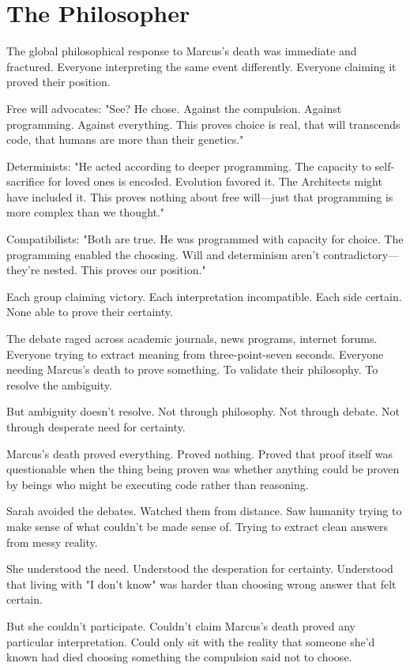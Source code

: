 \chapter{The Philosopher}
\label{ch:28}


The global philosophical response to Marcus's death was immediate and fractured. Everyone interpreting the same event differently. Everyone claiming it proved their position.

Free will advocates: "See? He chose. Against the compulsion. Against programming. Against everything. This proves choice is real, that will transcends code, that humans are more than their genetics."

Determinists: "He acted according to deeper programming. The capacity to self-sacrifice for loved ones is encoded. Evolution favored it. The Architects might have included it. This proves nothing about free will—just that programming is more complex than we thought."

Compatibilists: "Both are true. He was programmed with capacity for choice. The programming enabled the choosing. Will and determinism aren't contradictory—they're nested. This proves our position."

Each group claiming victory. Each interpretation incompatible. Each side certain. None able to prove their certainty.

The debate raged across academic journals, news programs, internet forums. Everyone trying to extract meaning from three-point-seven seconds. Everyone needing Marcus's death to prove something. To validate their philosophy. To resolve the ambiguity.

But ambiguity doesn't resolve. Not through philosophy. Not through debate. Not through desperate need for certainty.

Marcus's death proved everything. Proved nothing. Proved that proof itself was questionable when the thing being proven was whether anything could be proven by beings who might be executing code rather than reasoning.

\scenebreak

Sarah avoided the debates. Watched them from distance. Saw humanity trying to make sense of what couldn't be made sense of. Trying to extract clean answers from messy reality.

She understood the need. Understood the desperation for certainty. Understood that living with "I don't know" was harder than choosing wrong answer that felt certain.

But she couldn't participate. Couldn't claim Marcus's death proved any particular interpretation. Could only sit with the reality that someone she'd known had died choosing something the compulsion said not to choose.

